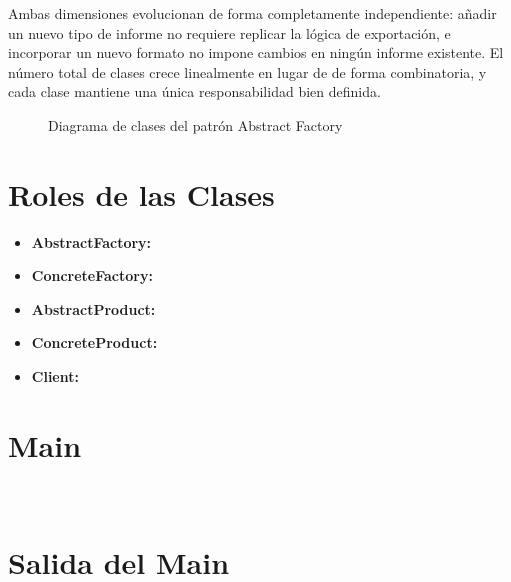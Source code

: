 Ambas dimensiones evolucionan de forma completamente independiente:
añadir un nuevo tipo de informe no requiere replicar la lógica de
exportación, e incorporar un nuevo formato no impone cambios en ningún
informe existente. El número total de clases crece linealmente en lugar
de de forma combinatoria, y cada clase mantiene una única responsabilidad
bien definida.

\begin{figure}[H]
    \centering
    \caption{Diagrama de clases del patrón Abstract Factory}
\end{figure}


\section{Roles de las Clases}


\begin{itemize}
    \item \textbf{AbstractFactory:}
    \item \textbf{ConcreteFactory:}
    \item \textbf{AbstractProduct:}
    \item \textbf{ConcreteProduct:}
    \item \textbf{Client:}
\end{itemize}


\section{Main}


\begin{lstlisting}[language=Java, caption=NombreClase]
 
\end{lstlisting}


\section{Salida del Main}

